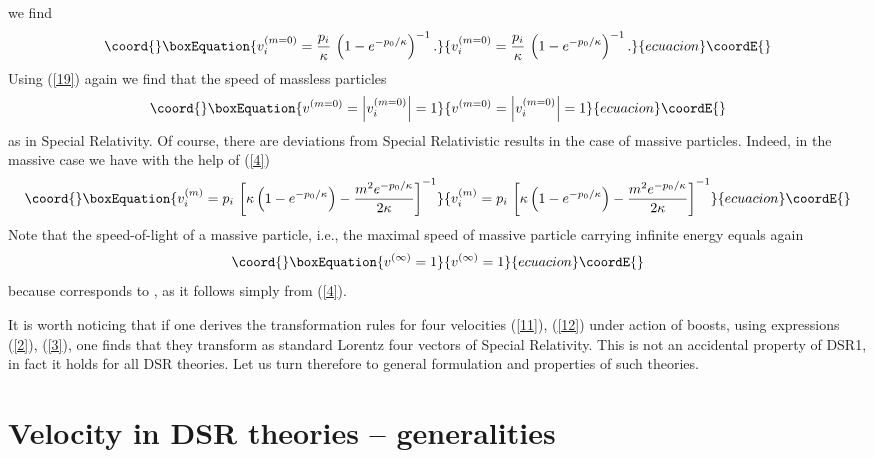 \documentclass  [12pt] {article}
\begin{document}
we find
\begin{equation}\coord{}\boxEquation{\label{20}
 v^{(m=0)}_i =   \frac{p_i}\kappa\,
 \left( 1 -e^{-  {p_0}/\kappa}\right)^{-1}.
}{v^{(m=0)}_i =   \frac{p_i}\kappa\,
 \left( 1 -e^{-  {p_0}/\kappa}\right)^{-1}.
}{ecuacion}\coordE{}\end{equation}
Using (\ref{19}) again we find that the speed of massless particles
\begin{equation}\coord{}\boxEquation{\label{20a}
 v^{(m=0)} = \left|v^{(m=0)}_i\right| = 1
}{v^{(m=0)} = \left|v^{(m=0)}_i\right| = 1
}{ecuacion}\coordE{}\end{equation}
as in Special Relativity. Of course, there are deviations from Special
Relativistic results in the case of massive particles. Indeed, in the massive
case  we have with the help of (\ref{4})
\begin{equation}\coord{}\boxEquation{\label{20b}
 v_i^{(m)} = p_i\, \left[\kappa\left(1-e^{-p_0/\kappa}\right) - \frac{m^2e^{-p_0/\kappa}}{2\kappa}\right]^{-1}
}{v_i^{(m)} = p_i\, \left[\kappa\left(1-e^{-p_0/\kappa}\right) - \frac{m^2e^{-p_0/\kappa}}{2\kappa}\right]^{-1}
}{ecuacion}\coordE{}\end{equation}
Note that the speed-of-light of a massive particle, i.e., the maximal speed of
massive particle carrying infinite energy equals again
\begin{equation}\coord{}\boxEquation{\label{20c}
  v^{(\infty)} =1
}{v^{(\infty)} =1
}{ecuacion}\coordE{}\end{equation}
because \coordHE{} corresponds to \coordHE{}, as it follows simply
from (\ref{4}).

It is worth noticing that if one derives the transformation rules for four
velocities (\ref{11}), (\ref{12}) under action of boosts, using expressions
(\ref{2}), (\ref{3}), one finds that they transform as standard Lorentz four
vectors of Special Relativity. This is not an accidental  property of DSR1, in
fact it holds for all DSR theories. Let us turn therefore to general
formulation and properties of such theories.

\section{Velocity in DSR theories -- generalities}
\end{document}
